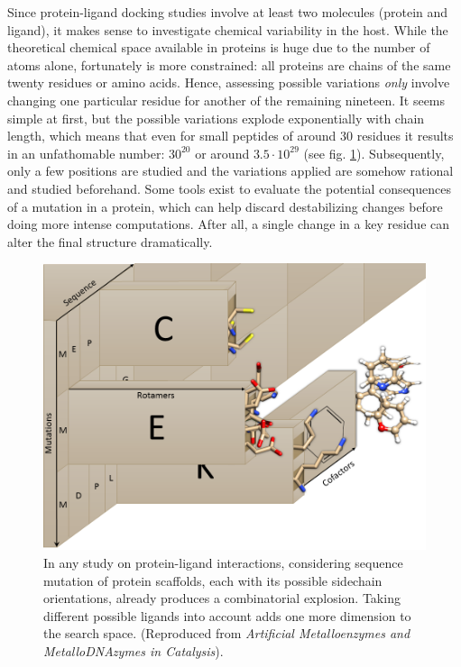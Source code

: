 Since protein-ligand docking studies involve at least two molecules (protein and ligand), it makes sense to investigate chemical variability in the host. While the theoretical chemical space available in proteins is huge due to the number of atoms alone, fortunately is more constrained: all proteins are chains of the same twenty residues or amino acids. Hence, assessing possible variations \textit{only} involve changing one particular residue for another of the remaining nineteen. It seems simple at first, but the possible variations explode exponentially with chain length, which means that even for small peptides of around 30 residues it results in an unfathomable number: $ 30^{20} $ or around $ 3.5·10^{29} $ (see fig. \ref{fig:chemicalspace}). Subsequently, only a few positions are studied and the variations applied are somehow rational and studied beforehand. Some tools exist to evaluate the potential consequences of a mutation in a protein,\cite{kumar2009predicting,quan2016strum,fariselli2015inps,dehouck2011popmusic} which can help discard destabilizing changes before doing more intense computations. After all, a single change in a key residue can alter the final structure dramatically.\cite{kumar2006protherm}

\begin{figure}[H]
	\includegraphics[width=\textwidth]{./figures/02/chemical_space.png}
	\caption[Chemobiological spaces]{
		In any study on protein-ligand interactions, considering sequence mutation of protein scaffolds, each with its possible sidechain orientations, already produces a combinatorial explosion. Taking different possible ligands into account adds one more dimension to the search space. (Reproduced from \textit{Artificial Metalloenzymes and MetalloDNAzymes in Catalysis}\cite{wileybook}).
	}
	\label{fig:chemicalspace}
\end{figure}


